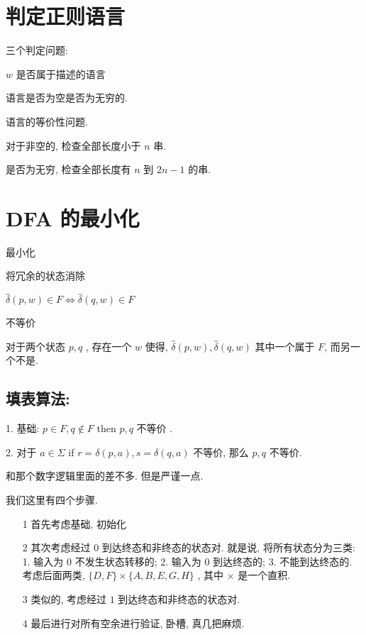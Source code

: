 \documentclass[../main_part1.tex]{subfiles}
\begin{document}
\section{判定正则语言}\label{sec:panding}


三个判定问题: 

\(w\) 是否属于描述的语言

语言是否为空是否为无穷的. 

语言的等价性问题. 

对于非空的, 检查全部长度小于 \(n\) 串. 

是否为无穷, 检查全部长度有 \(n\) 到 \(2 n - 1\) 的串. 


\section{DFA 的最小化}\label{sec:}

最小化

将冗余的状态消除

\(\hat\delta (p , w ) \in F \iff\hat\delta ( q , w ) \in F\)

不等价

对于两个状态 \(p, q\) , 存在一个 \(w\) 使得, \( \hat{\delta} (p , w )  , \hat\delta (q, w )\) 其中一个属于 \(F\), 而另一个不是. 

\subsection{填表算法:}\label{sse:table}
1. 基础: \( p \in F , q \notin F\) then \(p , q \) 不等价 .

2. 对于 \(a \in \Sigma\)  if \( r =\delta (p , a ) , s =\delta (q , a ) \) 不等价, 那么 \(p, q \) 不等价. 

和那个数字逻辑里面的差不多. 但是严谨一点.

我们这里有四个步骤. 

\begin{itemize}
\item [1] 首先考虑基础, 初始化 
\item [2] 其次考虑经过 \(0\) 到达终态和非终态的状态对. 
	就是说, 将所有状态分为三类: 1. 输入为 \(0\) 不发生状态转移的; 2. 输入为 \(0\) 到达终态的; 3. 不能到达终态的. 
	考虑后面两类,  \(\{ D , F \} \times \{ A, B , E , G , H \}\) , 其中 \(\times\) 是一个直积. 
\item [3] 类似的, 考虑经过 \(1\) 到达终态和非终态的状态对. 
\item [4] 最后进行对所有空余进行验证, 卧槽, 真几把麻烦.
\end{itemize}
\end{document}
